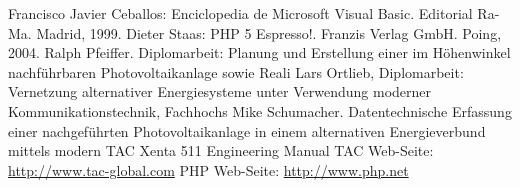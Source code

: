 \documentclass[12pt,a4paper,Spanish]{book}
\begin{document}
\begin{thebibliography}{99}
	 Francisco Javier Ceballos: Enciclopedia de Microsoft 	Visual Basic. Editorial Ra-Ma. Madrid, 1999.
	 Dieter Staas: PHP 5 Espresso!. Franzis Verlag GmbH.
	Poing, 2004.
	 Ralph Pfeiffer. Diplomarbeit: Planung und
	Erstellung einer im Höhenwinkel nachführbaren Photovoltaikanlage
	sowie Reali
	Lars Ortlieb, Diplomarbeit: Vernetzung alternativer
	Energiesysteme unter Verwendung moderner Kommunikationstechnik,
	Fachhochs
	 Mike Schumacher. Datentechnische Erfassung einer
	nachgeführten Photovoltaikanlage in einem alternativen
	Energieverbund mittels modern
	 TAC Xenta 511 Engineering Manual
	 TAC Web-Seite: \url{http://www.tac-global.com}
	 PHP Web-Seite: \url{http://www.php.net}
\end{thebibliography}
\end{document}
